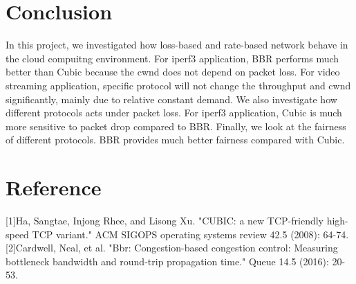 \documentclass{article}
\begin{document}
\section{Conclusion}
In this project, we investigated how loss-based and rate-based network behave in the cloud compuitng environment. For iperf3 application, BBR performs much better than Cubic because the cwnd does not depend on packet loss.
For video streaming application, specific protocol will not change the throughput and cwnd significantly, mainly due to relative constant demand. We also investigate how different protocols acts under packet loss. For iperf3 application,
Cubic is much more sensitive to packet drop compared to BBR. Finally, we look at the fairness of different protocols. BBR provides much better fairness compared with Cubic.

\section{Reference}
[1]Ha, Sangtae, Injong Rhee, and Lisong Xu. "CUBIC: a new TCP-friendly high-speed TCP variant." ACM SIGOPS operating systems review 42.5 (2008): 64-74.
\\[6pt]
[2]Cardwell, Neal, et al. "Bbr: Congestion-based congestion control: Measuring bottleneck bandwidth and round-trip propagation time." Queue 14.5 (2016): 20-53.
\end{document}
